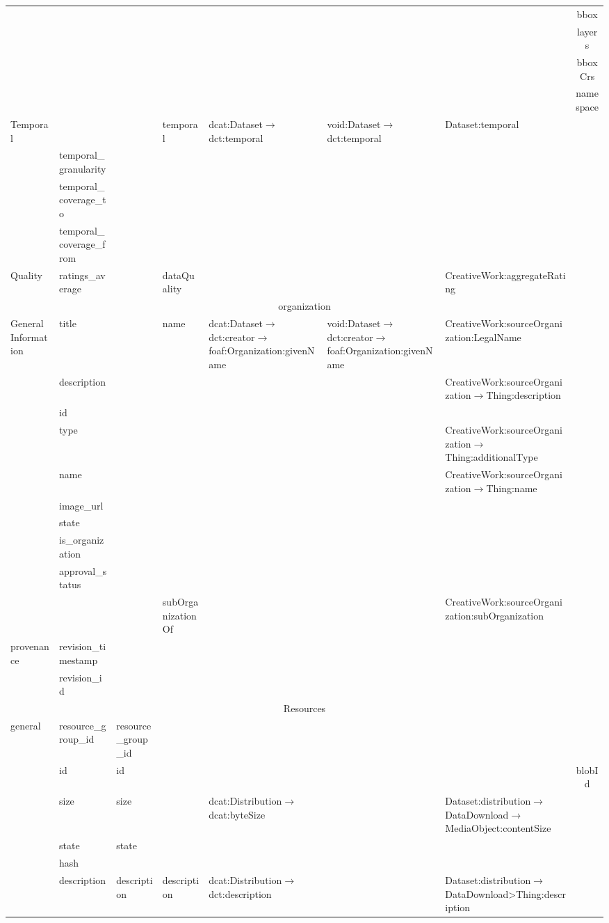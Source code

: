 \documentclass[runningheads,a4paper]{llncs}
\begin{document}
{\begin{longtable}{|p{1.5cm}|l|l|l|p{3cm}|m{3cm}|m{3cm}|c|}
 &  &  &  &  &  &  & bbox\tabularnewline
\cline{2-8}
 &  &  &  &  &  &  & layers\tabularnewline
\cline{2-8}
 &  &  &  &  &  &  & bboxCrs\tabularnewline
\cline{2-8}
 &  &  &  &  &  &  & namespace\tabularnewline
\hline
\hline
\multirow{4}{2cm}{Temporal} &  &  & temporal & dcat:Dataset$\rightarrow$dct:temporal & void:Dataset$\rightarrow$dct:temporal & Dataset:temporal & \tabularnewline
\cline{2-8}
 & temporal\_granularity &  &  &  &  &  & \tabularnewline
\cline{2-8}
 & temporal\_coverage\_to &  &  &  &  &  & \tabularnewline
\cline{2-8}
 & temporal\_coverage\_from &  &  &  &  &  & \tabularnewline
\hline
\hline
Quality & ratings\_average &  & dataQuality &  &  & CreativeWork:aggregateRating & \tabularnewline
\hline
\hline
\multicolumn{8}{|c|}{organization}\tabularnewline
\hline
\hline
\multirow{10}{2cm}{General Information} & title &  & name & dcat:Dataset$\rightarrow$dct:creator$\rightarrow$foaf:Organization:givenName & void:Dataset$\rightarrow$dct:creator$\rightarrow$foaf:Organization:givenName & CreativeWork:sourceOrganization:LegalName & \tabularnewline
\cline{2-8}
 & description &  &  &  &  & CreativeWork:sourceOrganization$\rightarrow$Thing:description & \tabularnewline
\cline{2-8}
 & id &  &  &  &  &  & \tabularnewline
\cline{2-8}
 & type &  &  &  &  & CreativeWork:sourceOrganization$\rightarrow$Thing:additionalType & \tabularnewline
\cline{2-8}
 & name &  &  &  &  & CreativeWork:sourceOrganization$\rightarrow$Thing:name & \tabularnewline
\cline{2-8}
 & image\_url &  &  &  &  &  & \tabularnewline
\cline{2-8}
 & state &  &  &  &  &  & \tabularnewline
\cline{2-8}
 & is\_organization &  &  &  &  &  & \tabularnewline
\cline{2-8}
 & approval\_status &  &  &  &  &  & \tabularnewline
\cline{2-8}
 &  &  & subOrganizationOf &  &  & CreativeWork:sourceOrganization:subOrganization & \tabularnewline
\hline
\hline
\multirow{2}{2cm}{provenance} & revision\_timestamp &  &  &  &  &  & \tabularnewline
\cline{2-8}
 & revision\_id &  &  &  &  &  & \tabularnewline
\hline
\hline
\multicolumn{8}{|c|}{Resources}\tabularnewline
\hline
\hline
\multirow{15}{2cm}{general} & resource\_group\_id & resource\_group\_id &  &  &  &  & \tabularnewline
\cline{2-8}
 & id & id &  &  &  &  & blobId\tabularnewline
\cline{2-8}
 & size & size &  & dcat:Distribution$\rightarrow$dcat:byteSize &  & Dataset:distribution$\rightarrow$DataDownload$\rightarrow$MediaObject:contentSize & \tabularnewline
\cline{2-8}
 & state & state &  &  &  &  & \tabularnewline
\cline{2-8}
 & hash &  &  &  &  &  & \tabularnewline
\cline{2-8}
 & description & description & description & dcat:Distribution$\rightarrow$dct:description &  & Dataset:distribution$\rightarrow$DataDownload>Thing:description & \tabularnewline

\end{longtable}}
\end{document}

